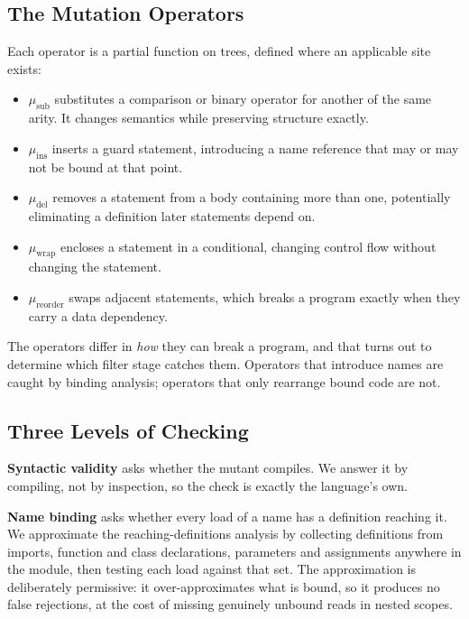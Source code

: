 \documentclass[10pt,twocolumn,letterpaper]{article}
\begin{document}
\subsection{The Mutation Operators}


Each operator is a partial function on trees, defined where an applicable site exists:

\begin{itemize}
  \item $\mu_{\text{sub}}$ substitutes a comparison or binary operator for another of the same arity. It changes semantics while preserving structure exactly.
  \item $\mu_{\text{ins}}$ inserts a guard statement, introducing a name reference that may or may not be bound at that point.
  \item $\mu_{\text{del}}$ removes a statement from a body containing more than one, potentially eliminating a definition later statements depend on.
  \item $\mu_{\text{wrap}}$ encloses a statement in a conditional, changing control flow without changing the statement.
  \item $\mu_{\text{reorder}}$ swaps adjacent statements, which breaks a program exactly when they carry a data dependency.
\end{itemize}

The operators differ in \textit{how} they can break a program, and that turns out to determine which filter stage catches them. Operators that introduce names are caught by binding analysis; operators that only rearrange bound code are not.


\subsection{Three Levels of Checking}


\textbf{Syntactic validity} asks whether the mutant compiles. We answer it by compiling, not by inspection, so the check is exactly the language's own.

\textbf{Name binding} asks whether every load of a name has a definition reaching it. We approximate the reaching-definitions analysis by collecting definitions from imports, function and class declarations, parameters and assignments anywhere in the module, then testing each load against that set. The approximation is deliberately permissive: it over-approximates what is bound, so it produces no false rejections, at the cost of missing genuinely unbound reads in nested scopes.
\end{document}
